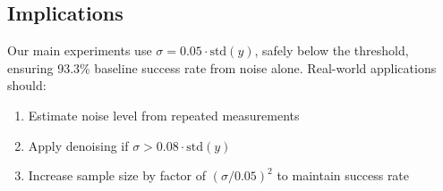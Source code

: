 \documentclass[twoside,11pt]{article}
\begin{document}
\subsection{Implications}

Our main experiments use $\sigma = 0.05 \cdot \text{std}(y)$, safely below the threshold, ensuring 93.3\% baseline success rate from noise alone. Real-world applications should:
\begin{enumerate}
\item Estimate noise level from repeated measurements
\item Apply denoising if $\sigma > 0.08 \cdot \text{std}(y)$
\item Increase sample size by factor of $(\sigma / 0.05)^2$ to maintain success rate
\end{enumerate}

\end{document}
